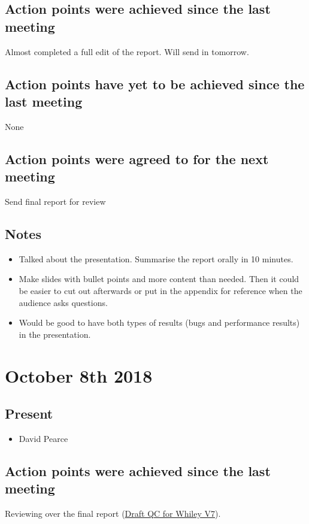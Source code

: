 \documentclass[]{article}
\begin{document}
\subsection{Action points were achieved since the last meeting}
Almost completed a full edit of the report. Will send in tomorrow.
\subsection{Action points have yet to be achieved since the last meeting}
None
\subsection{Action points were agreed to for the next meeting}
Send final report for review

\subsection{Notes}
\begin{itemize}
	\item Talked about the presentation. Summarise the report orally in 10 minutes. 
	\item Make slides with bullet points and more content than needed. Then it could be easier to cut out afterwards or put in the appendix for reference when the audience asks questions.
	\item Would be good to have both types of results (bugs and performance results) in the presentation.
\end{itemize}



\section{October 8th 2018}
\subsection{Present}
\begin{itemize}
	\item David Pearce
\end{itemize}

\subsection{Action points were achieved since the last meeting}
Reviewing over the final report (\href{https://gitlab.ecs.vuw.ac.nz/project489-2018/chinjani/quickcheck-for-whiley-final-report/blob/master/Draft%20V7%20QuickCheck%20for%20Whiley%20-%20Janice%20Chin.pdf}{Draft QC for Whiley V7}). 
\end{document}
